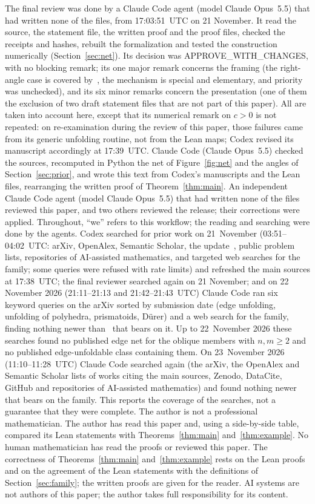 \documentclass[11pt]{article}
\theoremstyle{definition}
\theoremstyle{remark}
\begin{document}
The final review was done by a Claude Code agent (model Claude Opus~5.5) that
had written none of the files, from 17:03:51~UTC on 21 November. It read the
source, the statement file, the written proof and the proof files, checked the
receipts and hashes, rebuilt the formalization and tested the construction
numerically (Section~\ref{sec:net}). Its decision was
APPROVE\_WITH\_CHANGES, with no blocking remark; its one major remark concerns
the framing (the right-angle case is covered by~\cite{oro22}, the mechanism is
special and elementary, and priority was unchecked), and its six minor remarks
concern the presentation (one of them the exclusion of two draft statement
files that are not part of this paper). All are taken into account here,
except that its numerical remark on $c>0$ is not repeated: on re-examination during the review of this paper,
those failures came from its generic unfolding routine, not from the Lean
maps; Codex
revised its manuscript accordingly at 17:39~UTC. Claude Code (Claude
Opus~5.5) checked the sources, recomputed in Python the net of
Figure~\ref{fig:net} and the angles of Section~\ref{sec:prior}, and wrote this
text from Codex's manuscripts and the Lean files, rearranging the written
proof of Theorem~\ref{thm:main}. An independent Claude Code agent (model Claude Opus~5.5) that had written none of the files reviewed this paper, and two others reviewed the release; their corrections were applied. Throughout, ``we'' refers to
this workflow; the reading and searching were done by the agents. Codex
searched for prior work on 21~November (03:51--04:02~UTC: arXiv, OpenAlex,
Semantic Scholar, the update~\cite{do25}, public problem lists, repositories of
AI-assisted mathematics, and targeted web searches for the family; some
queries were refused with rate limits) and refreshed the main sources at
17:38~UTC; the final reviewer searched again on 21 November; and on
22 November 2026 (21:11--21:13 and 21:42--21:43~UTC) Claude Code ran six
keyword queries on the arXiv sorted by submission date (edge unfolding,
unfolding of polyhedra, prismatoids, D\"urer) and a web search for the family,
finding nothing newer than~\cite{mit26} that bears on it. Up to 22~November
2026 these searches found no published edge net for the oblique members with
$n,m\ge2$ and no published edge-unfoldable class containing them.
On 23~November 2026 (11:10--11:28~UTC) Claude Code searched again (the arXiv, the OpenAlex and Semantic Scholar lists of works citing the main sources, Zenodo, DataCite, GitHub and repositories of AI-assisted mathematics) and found nothing newer that bears on the family. This reports the coverage of the searches, not a guarantee
that they were complete. The author is not a professional mathematician.
The author has read this paper and, using a side-by-side table, compared its Lean statements with Theorems~\ref{thm:main} and~\ref{thm:example}. No human mathematician has read the proofs or reviewed this
paper. The correctness of Theorems~\ref{thm:main} and~\ref{thm:example} rests
on the Lean proofs and on the agreement of the Lean statements with the
definitions of Section~\ref{sec:family}; the written proofs are given for the
reader. AI systems are not authors of this paper; the author takes full
responsibility for its content.
\end{document}
